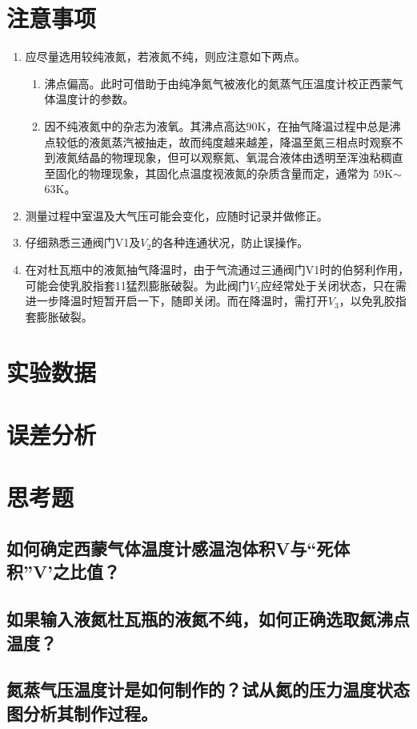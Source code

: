 \documentclass[a4paper]{article}
\begin{document}
\section{注意事项}
\begin{enumerate}
\item 应尽量选用较纯液氮，若液氮不纯，则应注意如下两点。
\begin{enumerate}
\item 沸点偏高。此时可借助于由纯净氮气被液化的氮蒸气压温度计校正西蒙气体温度计的参数。
\item 因不纯液氮中的杂志为液氧。其沸点高达90K，在抽气降温过程中总是沸点较低的液氮蒸汽被抽走，故而纯度越来越差，降温至氮三相点时观察不到液氮结晶的物理现象，但可以观察氮、氧混合液体由透明至浑浊粘稠直至固化的物理现象，其固化点温度视液氮的杂质含量而定，通常为 59K$\sim$63K。
\end{enumerate}
\item 测量过程中室温及大气压可能会变化，应随时记录并做修正。
\item 仔细熟悉三通阀门V1及$V_2$的各种连通状况，防止误操作。
\item 在对杜瓦瓶中的液氮抽气降温时，由于气流通过三通阀门V1时的伯努利作用，可能会使乳胶指套11猛烈膨胀破裂。为此阀门$V_3$应经常处于关闭状态，只在需进一步降温时短暂开启一下，随即关闭。而在降温时，需打开$V_3$，以免乳胶指套膨胀破裂。
\end{enumerate}

\section{实验数据}

\section{误差分析}

\section{思考题}
\subsection{如何确定西蒙气体温度计感温泡体积V与“死体积”V’之比值？}
\subsection{如果输入液氮杜瓦瓶的液氮不纯，如何正确选取氮沸点温度？}
\subsection{氮蒸气压温度计是如何制作的？试从氮的压力温度状态图分析其制作过程。}
\end{document}
